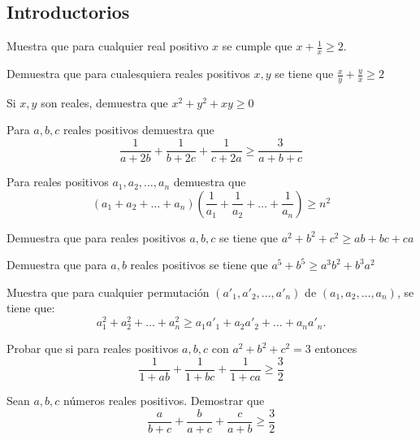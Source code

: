 \documentclass[11pt]{scrartcl}
\begin{document}
\subsection{Introductorios}
\begin{exercise}
    Muestra que para cualquier real positivo $x$ se cumple que $x+\frac 1x \geq 2$.
    \label{INEQOMMBOOK-EJ1.19}
\end{exercise}
\begin{exercise}
    Demuestra que para cualesquiera reales positivos $x,y$ se tiene que $\frac xy + \frac yx \geq 2$
    \label{INEQOMMBOOK-EJ1.24}
\end{exercise}
\begin{exercise}
    Si $x,y$ son reales, demuestra que $x^2+y^2+xy \geq 0$
\end{exercise}
\begin{exercise}
    Para $a,b,c$ reales positivos demuestra que 
    \[\frac{1}{a+2b}+\frac{1}{b+2c}+\frac{1}{c+2a} \geq \frac{3}{a+b+c}\]
\end{exercise}
\begin{exercise}
    Para reales positivos $a_1,a_2,\ldots,a_n$ demuestra que 
    \[(a_1+a_2+\ldots+a_n)\left(\frac{1}{a_1}+\frac{1}{a_2}+\ldots+\frac{1}{a_n}\right)\geq n^2\]
    \label{INEQOMMBOOK-EJ1.36}
\end{exercise}
\begin{exercise}
    Demuestra que para reales positivos $a,b,c$ se tiene que $a^2+b^2+c^2 \geq ab+bc+ca$ 
\end{exercise}
\begin{exercise}
    Demuestra que para $a,b$ reales positivos se tiene que 
    $a^5+b^5 \geq a^3b^2+b^3a^2$
    \label{MHDDEB}
\end{exercise}
\begin{exercise}
Muestra que para cualquier permutaci\'on $\left(a'_1, a'_2, \dots, a'_n\right)$ de $\left(a_1, a_2, \dots, a_n\right)$, se tiene que:
\begin{equation*}
    a^2_1 + a^2_2 + \dots + a^2_n \geq a_1a'_1 + a_2a'_2 + \dots + a_na'_n.
\end{equation*}
\label{INEQOMMBOOK-COR1.4.1}
\end{exercise}
\begin{exercise}
Probar que si para reales positivos $a,b,c$ con $a^2+b^2+c^2=3$ entonces
\[ \frac{1}{1+ab}+\frac{1}{1+bc}+\frac{1}{1+ca} \geq \frac32\]
\label{MEXTST24-8-3}
\end{exercise}

\begin{exercise}
Sean $a, b, c$ n\'umeros reales positivos. Demostrar que
\begin{equation*}
    \frac{a}{b+c} + \frac{b}{a+c} + \frac{c}{a+b} \geq \frac{3}{2}
\end{equation*}
\label{NESBITT}
\end{exercise}
\end{document}

